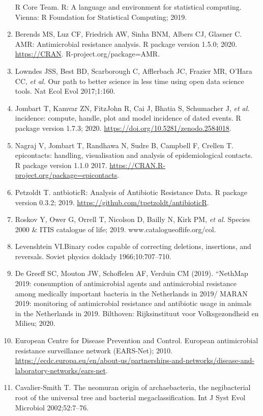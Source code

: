 \documentclass[
]{book}
\begin{document}
\begin{enumerate}
  R Core Team. R: A language and environment for statistical computing. Vienna: R Foundation for Statistical Computing; 2019.
\item
  Berends MS, Luz CF, Friedrich AW, Sinha BNM, Albers CJ, Glasner C. AMR: Antimicrobial resistance analysis. R package version 1.5.0; 2020. \url{https://CRAN}. R-project.org/package=AMR.
\item
  Lowndes JSS, Best BD, Scarborough C, Afflerbach JC, Frazier MR, O'Hara CC, \emph{et al.} Our path to better science in less time using open data science tools. Nat Ecol Evol 2017;1:160.
\item
  Jombart T, Kamvar ZN, FitzJohn R, Cai J, Bhatia S, Schumacher J, \emph{et al.} incidence: compute, handle, plot and model incidence of dated events. R package version 1.7.3; 2020. \url{https://doi.org/10.5281/zenodo.2584018}.
\item
  Nagraj V, Jombart T, Randhawa N, Sudre B, Campbell F, Crellen T. epicontacts: handling, visualisation and analysis of epidemiological contacts. R package version 1.1.0 2017. \url{https://CRAN.R-project.org/package=epicontacts}.
\item
  Petzoldt T. antbioticR: Analysis of Antibiotic Resistance Data. R package version 0.3.2; 2019. \url{https://github.com/tpetzoldt/antibioticR}.
\item
  Roskov Y, Ower G, Orrell T, Nicolson D, Bailly N, Kirk PM, \emph{et al.} Species 2000 \& ITIS catalogue of life; 2019. www.catalogueoflife.org/col.
\item
  Levenshtein VI.Binary codes capable of correcting deletions, insertions, and reversals. Soviet physics doklady 1966;10:707--710.
\item
  De Greeff SC, Mouton JW, Schoffelen AF, Verduin CM (2019). ``NethMap 2019: consumption of antimicrobial agents and antimicrobial resistance among medically important bacteria in the Netherlands in 2019/ MARAN 2019: monitoring of antimicrobial resistance and antibiotic usage in animals in the Netherlands in 2019. Bilthoven: Rijksinstituut voor Volksgezondheid en Milieu; 2020.
\item
  European Centre for Disease Prevention and Control. European antimicrobial resistance surveillance network (EARS-Net); 2010. \url{https://ecdc.europa.eu/en/about-us/partnerships-and-networks/disease-and-laboratory-networks/ears-net}.
\item
  Cavalier-Smith T. The neomuran origin of archaebacteria, the negibacterial root of the universal tree and bacterial megaclassification. Int J Syst Evol Microbiol 2002;52:7--76.

\end{enumerate}
\end{document}
